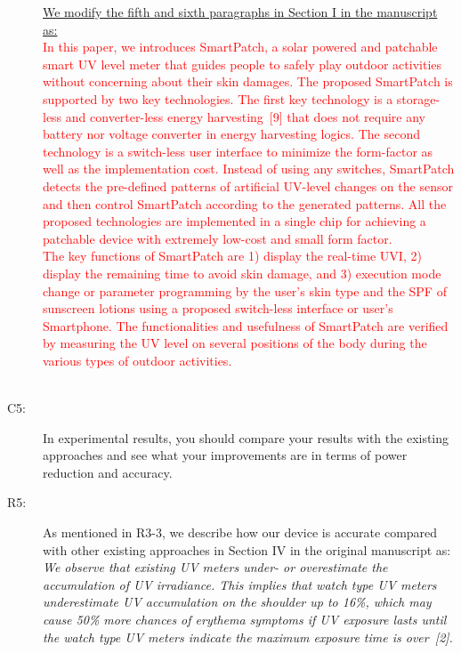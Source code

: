 \documentclass[onecolumn]{IEEEconf}
\begin{document}
\begin{description}
\underline{We modify the fifth and sixth paragraphs in Section I in the manuscript as:}\\
\textcolor{red}{In this paper, we introduces SmartPatch, a solar powered  and patchable smart UV level meter that guides people to safely play outdoor activities without concerning about their skin damages. The proposed SmartPatch is supported by two key technologies. The first key technology is a storage-less and converter-less energy harvesting~[9] that does not require any battery nor voltage converter in energy harvesting logics. The second technology is a switch-less user interface to minimize the form-factor as well as the implementation cost. Instead of using any switches, SmartPatch detects the pre-defined patterns of artificial UV-level changes on the sensor and then control SmartPatch according to the generated patterns. All the proposed technologies are implemented in a single chip for achieving a patchable device with extremely low-cost and small form factor.\\
% 
The key functions of SmartPatch are 1) display the real-time UVI, 2) display the remaining time to avoid skin damage, and 3) execution mode change or parameter programming by the user's skin type and the SPF of sunscreen lotions using a proposed switch-less interface or user's Smartphone. The functionalities and usefulness of SmartPatch are verified by measuring the UV level on several positions of the body during the various types of outdoor activities.}\\

~\\

\item [C5: ] In experimental results, you should compare your results with the existing approaches and see what your improvements are in terms of power reduction and accuracy.
\item [R5: ] As mentioned in R3-3, we describe how our device is accurate compared with other existing approaches in Section IV in the original manuscript as:\\

\textit{We observe that existing UV meters under- or overestimate the accumulation of UV irradiance. This implies that watch type UV meters underestimate UV accumulation on the shoulder up to 16\%, which may cause 50\% more chances of erythema symptoms if UV exposure lasts until the watch type UV meters indicate the maximum exposure time is over~[2].}\\


\end{description}
\end{document}
